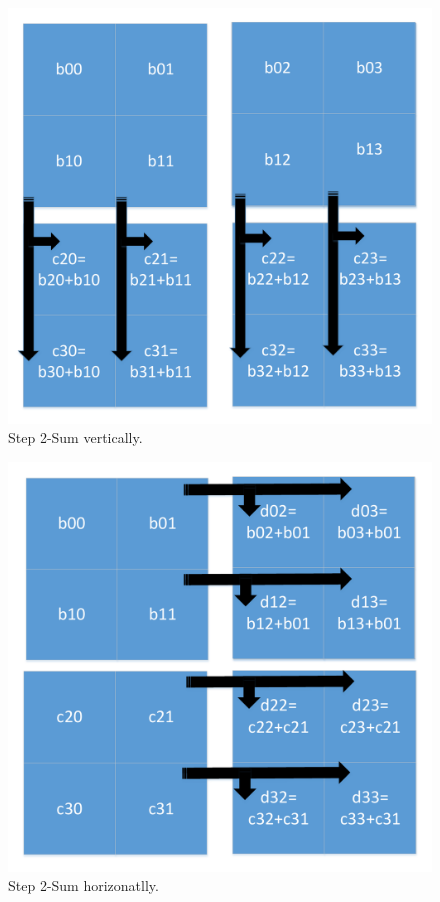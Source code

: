 \begin{enumerate}
   	   \begin{figure}[h]
   	   \centering	
   	   	\includegraphics[scale=0.40]{imm/iia/iia_step2aa}  
   	   	\caption{Step 2-Sum vertically.}
   	   	\label{fig:IIA2aa}
   	   \end{figure}
   	   
   	   \begin{figure}[h]
   	   	\centering
   	   	\includegraphics[scale=0.40]{imm/iia/iia_step2b}  
   	   	\caption{Step 2-Sum horizonatlly.} 
   	   	\label{fig:IIA2b}
   	   \end{figure}
  

\end{enumerate}
